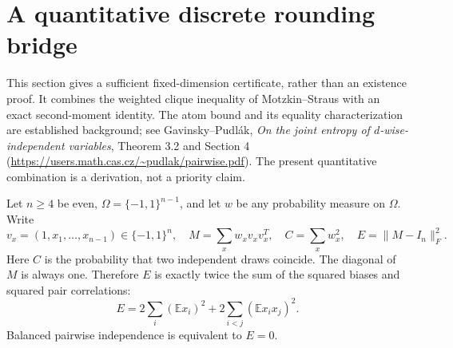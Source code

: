 \documentclass[11pt]{article}
\begin{document}
\section{A quantitative discrete rounding bridge}
\label{sec:discrete-rounding}
This section gives a sufficient fixed-dimension certificate, rather than
an existence proof. It combines the weighted clique inequality of
Motzkin--Straus with an exact second-moment identity. The atom bound
and its equality characterization are established background; see
Gavinsky--Pudl\'ak, \emph{On the joint entropy of $d$-wise-independent
variables}, Theorem 3.2 and Section 4
(\url{https://users.math.cas.cz/~pudlak/pairwise.pdf}).
The present quantitative combination is a derivation, not a priority claim.

Let $n\ge4$ be even, $\Omega=\{-1,1\}^{n-1}$, and let $w$ be any
probability measure on $\Omega$. Write
\[
 v_x=(1,x_1,\ldots,x_{n-1})\in\{-1,1\}^n,\quad
 M=\sum_xw_xv_xv_x^T,\quad C=\sum_xw_x^2,\quad
 E=\|M-I_n\|_F^2.
\]
Here $C$ is the probability that two independent draws coincide.
The diagonal of $M$ is always one. Therefore $E$ is exactly twice
the sum of the squared biases and squared pair correlations:
\[
 E=2\sum_i(\mathbb E x_i)^2+
   2\sum_{i<j}(\mathbb E x_ix_j)^2.
\]
Balanced pairwise independence is equivalent to $E=0$.
\end{document}
